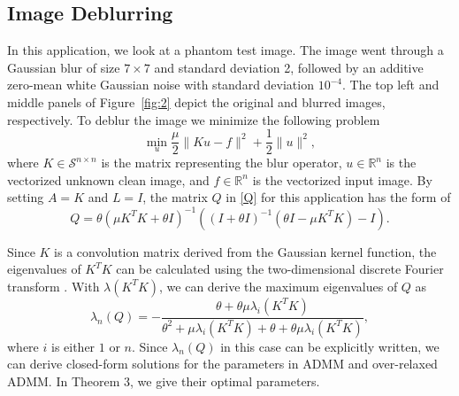 \documentclass[letterpaper]{article} %
\begin{document}
\subsection{Image Deblurring}
In this application, we look at a phantom test image. The image went through a Gaussian blur of size $7\times7$ and standard deviation 2, followed by an additive zero-mean white Gaussian noise with standard deviation $10^{-4}$. The top left and middle panels of Figure~\ref{fig:2} depict the original and blurred images, respectively. To deblur the image we minimize the following problem
\begin{equation}\label{deblurring2}
	\min\limits_{u}\frac{\mu}{2}\|K u-f\|^2+\frac{1}{2}\|u\|^2,
\end{equation}
where $K \in \mathcal{S}^{n\times n}$ is the matrix representing the blur operator, $u\in \mathbb{R}^{n}$ is the vectorized unknown clean image, and $f\in \mathbb{R}^{n}$ is the vectorized input image.  By setting $A=K$ and $L=I$, the matrix $Q$ in \eqref{Q} for this application has the form of  
\begin{equation*}%
	Q=\theta (\mu K^T K+\theta I)^{-1} (( I +\theta I)^{-1} (\theta I -  \mu K^T K )- I).
\end{equation*}

Since $K$ is a convolution matrix derived from the Gaussian kernel function, the eigenvalues of $K^T K$ can be calculated using the two-dimensional discrete Fourier transform \cite{capus2003fractional}. With $\lambda\left(K^T K\right)$, we can derive the maximum eigenvalues of $Q$ as
\begin{equation} \label{app1Q}
	\lambda_n(Q) =- \frac{\theta +\theta\mu \lambda_i(K^T K) }{\theta^2+\mu \lambda_i(K^T K) +\theta +\theta\mu \lambda_i(K^T K)},
\end{equation}
where $ i$ is either $1$ or $n$. Since $\lambda_n (Q)$ in this case can be explicitly written, we can derive closed-form solutions for the parameters in ADMM and over-relaxed ADMM. In Theorem 3, we give their optimal parameters.
\end{document}
